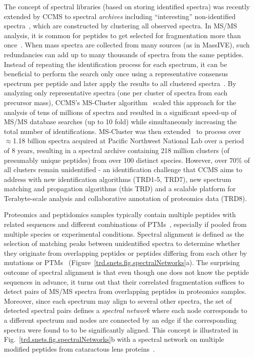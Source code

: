 \documentclass[arial,11pt]{article}
\begin{document}
The concept of spectral libraries (based on storing identified spectra) was recently extended by CCMS to spectral {\em archives} including ``interesting'' non-identified spectra~\cite{frank11}, which are constructed by clustering all observed spectra. In MS/MS analysis, it is common for peptides to get selected for fragmentation more than once~\cite{tabb03a}. When mass spectra are collected from many sources (as in MassIVE), such redundancies can add up to many thousands of spectra from the same peptides. Instead of repeating the identification process for each spectrum, it can be beneficial to perform the search only once using a representative consensus spectrum per peptide and later apply the results to all clustered spectra~\cite{tabb03a,beer04,tabb05}. By analyzing only representative spectra (one per cluster of spectra from each precursor mass), CCMS's MS-Cluster algorithm~\cite{frank08} scaled this approach for the analysis of tens of millions of spectra and resulted in a significant speed-up of MS/MS database searches (up to 10 fold) while simultaneously increasing the total number of identifications. MS-Cluster was then extended~\cite{frank11} to process over $\approx$1.18 billion spectra acquired at Pacific Northwest National Lab over a period of 8 years, resulting in a spectral archive containing 218 million clusters (of presumably unique peptides) from over 100 distinct species. However, over 70\% of all clusters remain unidentified \-- an identification challenge that CCMS aims to address with new identification algorithms (TRD1-5, TRD7), new spectrum matching and propagation algorithms (this TRD) and a scalable platform for Terabyte-scale analysis and collaborative annotation of proteomics data (TRD8).

Proteomics and peptidomics samples typically contain multiple peptides with related sequences and different combinations of PTMs~\cite{Hunyadi-Gulyas04, tanner05,tsur05,Wilmarth06}, especially if pooled from multiple species or experimental conditions.
 Spectral alignment is defined as the selection of matching peaks between unidentified spectra to determine whether they originate from overlapping peptides or peptides differing from each other by mutations or PTMs~\cite{bandeira04,bandeira07mcp,bandeira07pnas,guthals12metasps} (\mbox{Figure~\ref{trd.snets.fig.spectralNetworks}a}). The surprising outcome of spectral alignment is that even though one does not know the peptide sequences in advance, it turns out that their correlated fragmentation suffices to detect pairs of MS/MS spectra from overlapping peptides in proteomics samples. Moreover, since each spectrum may align to several other spectra, the set of detected spectral pairs defines a \emph{spectral network} where each node corresponds to a different spectrum and nodes are connected by an edge if the corresponding spectra were found to to be significantly aligned. This concept is illustrated in Fig.~\ref{trd.snets.fig.spectralNetworks}b with a spectral network on multiple modified peptides from cataractous lens proteins~\cite{bandeira07pnas}.
\end{document}
